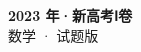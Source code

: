 \documentclass[zihao=-4, a4paper]{ctexart}
\begin{document}
\begin{center}
  {\Large\bfseries 2023 年·新高考Ⅰ卷}\\[4pt]
  {\large 数学 · 试题版}
\end{center}
\medskip
{}

\end{document}
